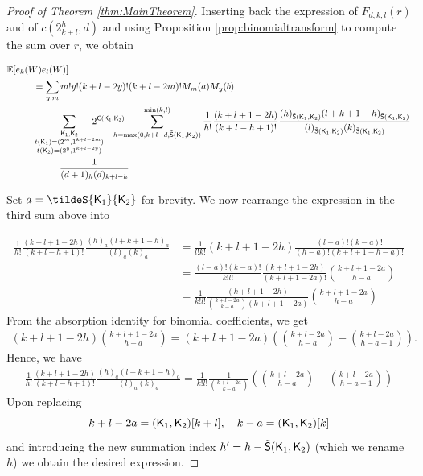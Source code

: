 \documentclass[11pt, a4paper, oneside, reqno]{amsart}
\newcommand{\sK}{{\sf K}}
\theoremstyle{remark}
\theoremstyle{definition}
\numberwithin{equation}{section}
\begin{document}
\begin{proof}[Proof of Theorem \ref{thm:MainTheorem}]
Inserting back the expression of $F_{d,k,l}(r)$ and of $c(2_{k+l}^h,d)$ and using Proposition \ref{prop:binomialtransform} to compute the sum over $r$, we obtain


\begin{align*}
	 & \mathbb{E}[e_k(W)e_l(W)]          \\
	 & \hspace{1cm}=  \sum_{y,m} {m!y!(k+l-2y)!(k+l-2m)!}M_m(a)M_y(b) \\
	 & \hspace{1cm} \sum_{\substack{\sf K_1, \sf K_2                   \\ {t({\sf K}_1)}=(2^m,1^{k+l-2m}) \\ {t({\sf K}_2)}=(2^y,1^{k+l-2y})}} \hspace{-0.5cm} 2^{{\sf C}({\sf K_1},{\sf K_2})} \hspace{-0.5cm} \sum_{h = {\rm max}(0,k+l-d, {\tilde{\sf S}}(\sK_1,\sK_2))}^{{\rm min}(k,l)}  \frac{1}{h!}\frac{(k+l+1-2h)}{(k+l-h+1)!}\frac{(h)_{\tilde{\sf S}({\sf K}_1,{\sf K}_{2})}(l+k+1-h)_{\tilde{\sf S}({\sf K}_1,{\sf K}_{2})}}{(l)_{\tilde{\sf S}({\sf K}_1,{\sf K}_{2})}(k)_{\tilde{\sf S}({\sf K}_1,{\sf K}_{2})}} \\
	 & \hspace{2cm}\frac{1}{(d+1)_h(d)_{k+l-h}}
\end{align*}

Set $a=\tildeS{\sK_1}{\sK_2}$ for brevity. We now rearrange the expression in the third sum above into 

\begin{align*}
\frac{1}{h!}\frac{(k+l+1-2h)}{(k+l-h+1)!}\frac{(h)_{a}(l+k+1-h)_{a}}{(l)_{a}(k)_{a}} &= \frac{1}{l!k!}(k+l+1-2h)\frac{(l-a)!(k-a)!}{(h-a)!(k+l+1-h-a)!} \\
&=\frac{(l-a)!(k-a)!}{k!l!}\frac{(k+l+1-2h)}{(k+l+1-2a)!}\binom{k+l+1-2a}{h-a} \\
&=\frac{1}{k!l!} \frac{(k+l+1-2h)}{\binom{k+l-2a}{k-a}(k+l+1-2a)}\binom{k+l+1-2a}{h-a}
\end{align*}
From the absorption identity for binomial coefficients, we get 
\begin{align*}
(k+l+1-2h)\binom{k+l+1-2a}{h-a} =(k+l+1-2a)(\binom{k+l-2a}{h-a}-\binom{k+l-2a}{h-a-1}).
\end{align*}
Hence, we have
\begin{align*}
\frac{1}{h!}\frac{(k+l+1-2h)}{(k+l-h+1)!}\frac{(h)_{a}(l+k+1-h)_{a}}{(l)_{a}(k)_{a}} = \frac{1}{k!l!}\frac{1}{\binom{k+l-2a}{k-a}}(\binom{k+l-2a}{h-a}-\binom{k+l-2a}{h-a-1})
\end{align*}
Upon replacing 
$$
k+l-2a = (\sK_1,\sK_2)[k+l], \quad k-a = (\sK_1,\sK_2)[k]
$$
and introducing the new summation index $h' = h -\tilde{\sf S}(\sK_1,\sK_2)$ (which we rename $h$) we obtain the desired expression.
\end{proof}



\end{document}
